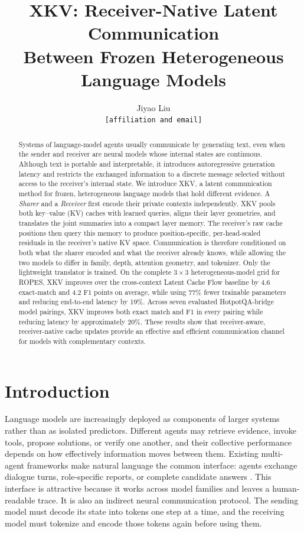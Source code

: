 \documentclass[11pt]{article}
\title{\textbf{XKV}: Receiver-Native Latent Communication\\
Between Frozen Heterogeneous Language Models}
\author{Jiyao Liu\\
  \texttt{[affiliation and email]}}
\date{}
\newcommand{\xkv}{\textsc{XKV}\xspace}
\newcommand{\sharer}{\textit{Sharer}\xspace}
\newcommand{\receiver}{\textit{Receiver}\xspace}
\begin{document}
\maketitle

\begin{abstract}
Systems of language-model agents usually communicate by generating text, even
when the sender and receiver are neural models whose internal states are
continuous. Although text is portable and interpretable, it introduces
autoregressive generation latency and restricts the exchanged information to a
discrete message selected without access to the receiver's internal state.
We introduce \xkv, a latent communication method for frozen, heterogeneous
language models that hold different evidence. A \sharer and a \receiver first
encode their private contexts independently. \xkv pools both key--value (KV)
caches with learned queries, aligns their layer geometries, and translates the
joint summaries into a compact layer memory. The receiver's raw cache positions
then query this memory to produce position-specific, per-head-scaled residuals
in the receiver's native KV space. Communication is therefore conditioned on
both what the sharer encoded and what the receiver already knows, while allowing
the two models to differ in family, depth, attention geometry, and tokenizer.
Only the lightweight translator is trained. On the complete $3\!\times\!3$
heterogeneous-model grid for ROPES, \xkv improves over the cross-context Latent
Cache Flow baseline by 4.6 exact-match and 4.2 F1 points on average, while using
77\% fewer trainable parameters and reducing end-to-end latency by 19\%.
Across seven evaluated HotpotQA-bridge model pairings, \xkv improves both exact
match and F1 in every pairing while reducing latency by approximately 20\%.
These results show that receiver-aware, receiver-native cache updates provide an
effective and efficient communication channel for models with complementary
contexts.
\end{abstract}

\section{Introduction}

Language models are increasingly deployed as components of larger systems
rather than as isolated predictors. Different agents may retrieve evidence,
invoke tools, propose solutions, or verify one another, and their collective
performance depends on how effectively information moves between them. Existing
multi-agent frameworks make natural language the common interface: agents
exchange dialogue turns, role-specific reports, or complete candidate answers
\cite{li2023camel,wu2023autogen,qian2023chatdev,hong2023metagpt,wang2024mixture}.
This interface is attractive because it works across model families and leaves a
human-readable trace. It is also an indirect neural communication protocol. The
sending model must decode its state into tokens one step at a time, and the
receiving model must tokenize and encode those tokens again before using them.
\end{document}
